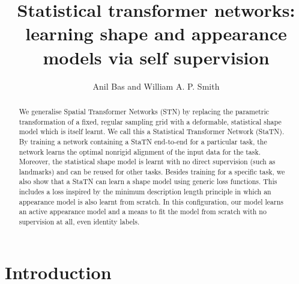 \documentclass[runningheads]{llncs}
\begin{document}
\pagestyle{headings}
\mainmatter
\def\ECCV18SubNumber{2124}  %

\title{Statistical transformer networks: learning shape and appearance models via self supervision}



\author{Anil Bas and William A. P. Smith}

\maketitle

\begin{abstract}
We generalise Spatial Transformer Networks (STN) by replacing the parametric transformation of a fixed, regular sampling grid with a deformable, statistical shape model which is itself learnt. We call this a Statistical Transformer Network (StaTN). By training a network containing a StaTN end-to-end for a particular task, the network learns the optimal nonrigid alignment of the input data for the task. Moreover, the statistical shape model is learnt with no direct supervision (such as landmarks) and can be reused for other tasks. Besides training for a specific task, we also show that a StaTN can learn a shape model using generic loss functions. This includes a loss inspired by the minimum description length principle in which an appearance model is also learnt from scratch. In this configuration, our model learns an active appearance model and a means to fit the model from scratch with no supervision at all, even identity labels.
\end{abstract}

\section{Introduction}
\end{document}
